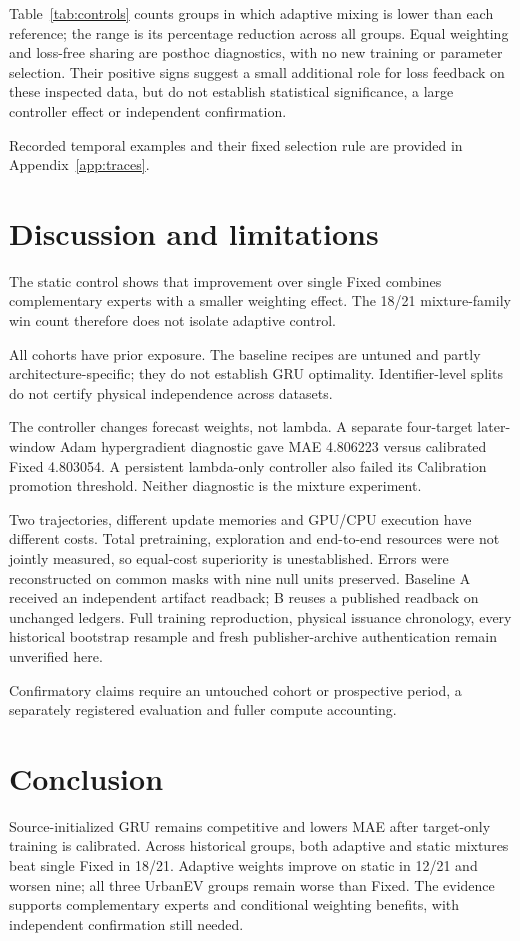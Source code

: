 \documentclass[pdflatex,iicol,sn-mathphys-num]{sn-jnl}
\begin{document}
Table~\ref{tab:controls} counts groups in which adaptive mixing is lower than each reference; the range is its percentage reduction across all groups. Equal weighting and loss-free sharing are posthoc diagnostics, with no new training or parameter selection. Their positive signs suggest a small additional role for loss feedback on these inspected data, but do not establish statistical significance, a large controller effect or independent confirmation.

Recorded temporal examples and their fixed selection rule are provided in Appendix~\ref{app:traces}.

\FloatBarrier
\section{Discussion and limitations}
The static control shows that improvement over single Fixed combines complementary experts with a smaller weighting effect. The 18/21 mixture-family win count therefore does not isolate adaptive control.

All cohorts have prior exposure. The baseline recipes are untuned and partly architecture-specific; they do not establish GRU optimality. Identifier-level splits do not certify physical independence across datasets.

The controller changes forecast weights, not lambda. A separate four-target later-window Adam hypergradient diagnostic gave MAE 4.806223 versus calibrated Fixed 4.803054. A persistent lambda-only controller also failed its Calibration promotion threshold. Neither diagnostic is the mixture experiment.

Two trajectories, different update memories and GPU/CPU execution have different costs. Total pretraining, exploration and end-to-end resources were not jointly measured, so equal-cost superiority is unestablished. Errors were reconstructed on common masks with nine null units preserved. Baseline A received an independent artifact readback; B reuses a published readback on unchanged ledgers. Full training reproduction, physical issuance chronology, every historical bootstrap resample and fresh publisher-archive authentication remain unverified here.

Confirmatory claims require an untouched cohort or prospective period, a separately registered evaluation and fuller compute accounting.

\section{Conclusion}
Source-initialized GRU remains competitive and lowers MAE after target-only training is calibrated. Across historical groups, both adaptive and static mixtures beat single Fixed in 18/21. Adaptive weights improve on static in 12/21 and worsen nine; all three UrbanEV groups remain worse than Fixed. The evidence supports complementary experts and conditional weighting benefits, with independent confirmation still needed.
\end{document}
